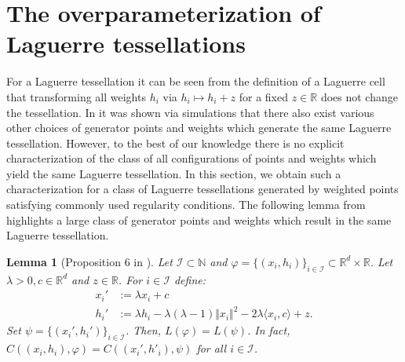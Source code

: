 \documentclass{article}
\newcommand{\NN}{\mathbb{N}}
\newcommand{\RR}{\mathbb{R}}
\theoremstyle{plain}
\newtheorem{lemma}{Lemma}
\theoremstyle{remark}
\theoremstyle{definition}
\begin{document}
\section{The overparameterization of Laguerre tessellations}\label{section_overparameterization_laguerre}

For a Laguerre tessellation it can be seen from the definition of a Laguerre cell that transforming all weights $h_i$ via $h_i \mapsto h_i + z$ for a fixed $z \in \RR$ does not change the tessellation. In \cite{Duan2014} it was shown via simulations that there also exist various other choices of generator points and weights which generate the same Laguerre tessellation. However, to the best of our knowledge there is no explicit characterization of the class of all configurations of points and weights which yield the same Laguerre tessellation. In this section, we obtain such a characterization for a class of Laguerre tessellations generated by weighted points satisfying commonly used regularity conditions. The following lemma from \cite{Meyron2019} highlights a large class of generator points and weights which result in the same Laguerre tessellation. 

\begin{lemma}[Proposition 6 in \cite{Meyron2019}]\label{overparameterization_laguerre_easy}
    Let $\mathcal{I} \subset \NN$ and $ \varphi =\{(x_i,h_i)\}_{i \in \mathcal{I}} \subset \RR^d \times \RR$. Let $\lambda > 0, c \in \RR^d$ and $z \in \RR$. For $i \in \mathcal{I}$ define:
\begin{align*}
    x_i' &:= \lambda x_i + c\\
    h_i' &:= \lambda h_i - \lambda(\lambda - 1)\Vert x_i \Vert^2 - 2\lambda \langle x_i, c\rangle + z.
\end{align*}
Set $\psi = \{(x_i',h_i')\}_{i \in \mathcal{I}}$. Then, $L(\varphi) = L(\psi)$. In fact, $C((x_i,h_i),\varphi) = C((x_i',h'_i),\psi)$ for all $i \in \mathcal{I}$.
\end{lemma}
\end{document}
